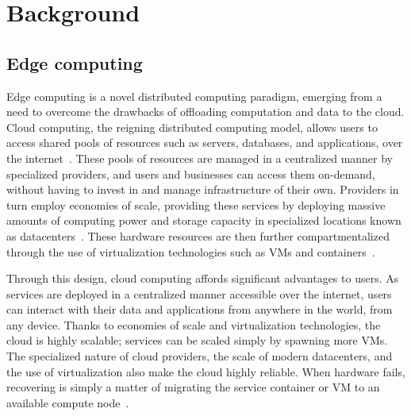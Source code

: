 \section{Background}

\subsection{Edge computing}
\glsresetall%

Edge computing is a novel distributed computing paradigm, emerging from a need to overcome the drawbacks of offloading computation and data to the cloud.
Cloud computing, the reigning distributed computing model, allows users to access shared pools of resources such as servers, databases, and applications, over the internet~\cite{gai2012towards}.
These pools of resources are managed in a centralized manner by specialized providers, and users and businesses can access them on-demand, without having to invest in and manage infrastructure of their own.
Providers in turn employ economies of scale, providing these services by deploying massive amounts of computing power and storage capacity in specialized locations known as datacenters~\citationeeded.
These hardware resources are then further compartmentalized through the use of virtualization technologies such as \glspl{VM} and containers~\cite{gai2012towards}.

Through this design, cloud computing affords significant advantages to users.
As services are deployed in a centralized manner accessible over the internet, users can interact with their data and applications from anywhere in the world, from any device.
Thanks to economies of scale and virtualization technologies, the cloud is highly scalable;
services can be scaled simply by spawning more \glspl{VM}.
The specialized nature of cloud providers, the scale of modern datacenters, and the use of virtualization also make the cloud highly reliable.
When hardware fails, recovering is simply a matter of migrating the service container or \gls{VM} to an available compute node~\cite{endo2016high}.

